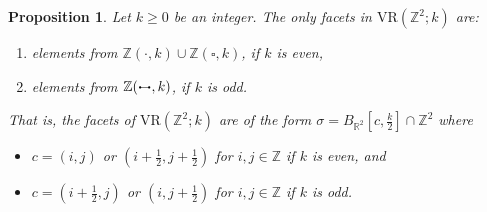 \documentclass[12pt,a4paper]{amsart}
\newcommand\edge{\mathrel{\boldsymbol{\cdot}\mkern-4mu{-}\mkern-4mu\boldsymbol{\cdot}}}
\newtheorem{proposition}[theorem]{Proposition}
\theoremstyle{definition}
\newcommand{\R}{\ensuremath{\mathbb{R}}}
\newcommand{\Z}{\ensuremath{\mathbb{Z}}}
\newcommand{\vr}[2]{\mathrm{VR}(#1;#2)}
\numberwithin{equation}{section}
\begin{document}
\begin{proposition}
\label{Proposition:MaximalSimplices}
Let $k\ge 0$ be an integer.
The only facets in $\vr{\Z^2}{k}$ are:
\begin{enumerate}
\item elements from $\Z ( \boldsymbol{\cdot} , k) \cup \Z (\square, k)$, if $k$ is even,
\item elements from $\Z ( \edge, k)$, if $k$ is odd.
\end{enumerate}
That is, the facets of $\vr{\Z^2}{k}$ are of the form $\sigma = B_{\R^2}[c,\frac{k}{2}] \cap \Z^2$ where
\begin{itemize}
\item $c=(i,j)$ or $(i+\frac{1}{2},j+\frac{1}{2})$ for $i,j\in \Z$ if $k$ is even, and
\item $c=(i+\frac{1}{2},j)$ or $(i,j+\frac{1}{2})$ for $i,j\in \Z$ if $k$ is odd.
\end{itemize}
\end{proposition}
\end{document}

